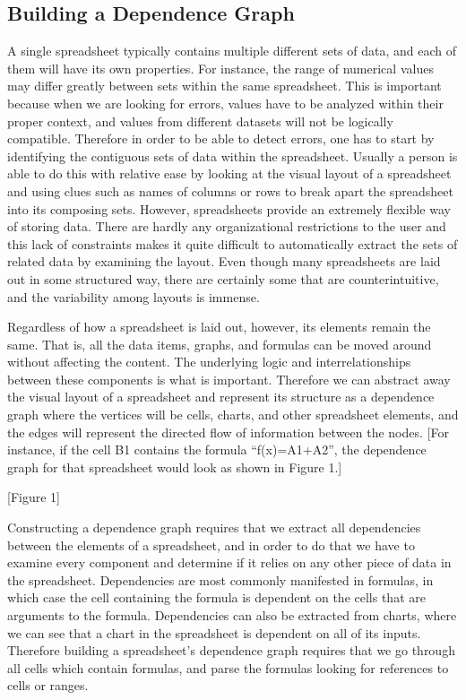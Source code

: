 \subsection{Building a Dependence Graph}

A single spreadsheet typically contains multiple different sets of
data, and each of them will have its own properties.  For instance,
the range of numerical values may differ greatly between sets within
the same spreadsheet.  This is important because when we are looking
for errors, values have to be analyzed within their proper context,
and values from different datasets will not be logically compatible.
Therefore in order to be able to detect errors, one has to start by
identifying the contiguous sets of data within the spreadsheet.
Usually a person is able to do this with relative ease by looking at
the visual layout of a spreadsheet and using clues such as names of
columns or rows to break apart the spreadsheet into its composing
sets.  However, spreadsheets provide an extremely flexible way of
storing data.  There are hardly any organizational restrictions to the
user and this lack of constraints makes it quite difficult to
automatically extract the sets of related data by examining the
layout.  Even though many spreadsheets are laid out in some structured
way, there are certainly some that are counterintuitive, and the
variability among layouts is immense.

Regardless of how a spreadsheet is laid out, however, its elements
remain the same.  That is, all the data items, graphs, and formulas
can be moved around without affecting the content.  The underlying
logic and interrelationships between these components is what is
important.  Therefore we can abstract away the visual layout of a
spreadsheet and represent its structure as a dependence graph where
the vertices will be cells, charts, and other spreadsheet elements,
and the edges will represent the directed flow of information between
the nodes.  [For instance, if the cell B1 contains the formula
 ``f(x)=A1+A2'', the dependence graph for that spreadsheet would
  look as shown in Figure 1.]

[Figure 1]

Constructing a dependence graph requires that we extract all
dependencies between the elements of a spreadsheet, and in order to do 
that we have to examine every component and determine if it relies 
on any other piece of data in the spreadsheet.  Dependencies are most
commonly manifested in formulas, in which case the cell containing the 
formula is dependent on the cells that are arguments to the formula.  
Dependencies can also be extracted from charts, where we can see that 
a chart in the spreadsheet is dependent on all of its inputs.  Therefore 
building a spreadsheet's dependence graph requires that we go through 
all cells which contain formulas, and parse the formulas looking for 
references to cells or ranges.  

